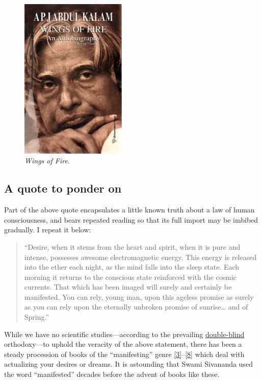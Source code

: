 \documentclass[
  a4paper,
]{article}
\begin{document}
\begin{figure}
\centering
\includegraphics[width=0.45\textwidth,height=\textheight]{images/Wings-of-Fire.jpg}
\caption{\emph{Wings of Fire}.}
\end{figure}

\hypertarget{a-quote-to-ponder-on}{%
\subsection{A quote to ponder on}\label{a-quote-to-ponder-on}}

Part of the above quote encapsulates a little known truth about a law of
human consciousness, and bears repeated reading so that its full import
may be imbibed gradually. I repeat it below:

\begin{quote}
``Desire, when it stems from the heart and spirit, when it is pure and
intense, possesses awesome electromagnetic energy. This energy is
released into the ether each night, as the mind falls into the sleep
state. Each morning it returns to the conscious state reinforced with
the cosmic currents. That which has been imaged will surely and
certainly be manifested. You can rely, young man, upon this ageless
promise as surely as you can rely upon the eternally unbroken promise of
sunrise\ldots{} and of Spring.''
\end{quote}

While we have no scientific studies---according to the prevailing
\href{https://dictionary.cambridge.org/dictionary/english/double-blind}{double-blind}
orthodoxy---to uphold the veracity of the above statement, there has
been a steady procession of books of the ``manifesting'' genre
\protect\hyperlink{ref-murphy2006}{{[}3{]}}--\protect\hyperlink{ref-ferraro2021}{{[}8{]}}
which deal with actualizing your desires or dreams. It is astounding
that Swami Sivananda used the word ``manifested'' decades before the
advent of books like these.
\end{document}
